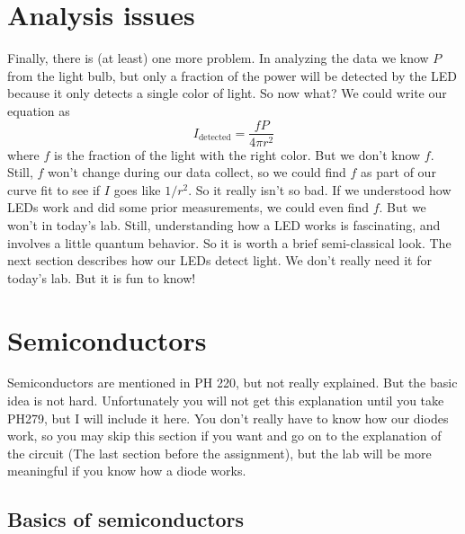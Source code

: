 \section{Analysis issues}

Finally, there is (at least) one more problem. In analyzing the data we know 
$P$ from the light bulb, but only a fraction of the power will be detected
by the LED because it only detects a single color of light. So now what? We
could write our equation as 
\begin{equation*}
I_{\text{detected}}=\frac{fP}{4\pi r^{2}}
\end{equation*}%
where $f$ is the fraction of the light with the right color. But we don't
know $f.$ Still, $f$ won't change during our data collect, so we could find $%
f$ as part of our curve fit to see if $I$ goes like $1/r^{2}.$ So it really
isn't so bad. If we understood how LEDs work and did some prior
measurements, we could even find $f.$ But we won't in today's lab. Still,
understanding how a LED works is fascinating, and involves a little quantum
behavior. So it is worth a brief semi-classical look. The next section
describes how our LEDs detect light. We don't really need it for today's
lab. But it is fun to know!

\section{Semiconductors \label{Semiconductors}}

Semiconductors are mentioned in PH 220, but not really explained. But the
basic idea is not hard. Unfortunately you will not get this explanation
until you take PH279, but I will include it here. You don't really have to
know how our diodes work, so you may skip this section if you want and go on
to the explanation of the circuit (The last section before the assignment),
but the lab will be more meaningful if you know how a diode works.

\subsection{Basics of semiconductors}

